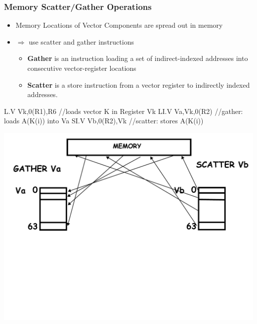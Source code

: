 \documentclass{beamer}
\newcommand{\emp}[1]{\textcolor{DikuRed}{ #1}}
\begin{document}
\begin{frame}[fragile,t]
\frametitle{Memory Scatter/Gather Operations}

\begin{itemize}
    \item Memory Locations of Vector Components are spread out in memory
    \item $\Rightarrow$ use scatter and gather instructions\medskip 
        \begin{itemize}
            \item \emp{\bf Gather} is an instruction loading a set of
                    indirect-indexed addresses into consecutive 
                    vector-register locations\smallskip
            \item \emp{\bf Scatter} is a store instruction from a vector
                    register to indirectly indexed addresses.
        \end  {itemize}
\end  {itemize}

\begin{colorcode}[fontsize=\scriptsize]
L.V   Vk,0(R1),R6  //loads vector K in Register Vk
LI.V  Va,Vk,0(R2)  //gather: loads A(K(i)) into Va
SI.V  Vb,0(R2),Vk  //scatter: stores A(K(i))
\end{colorcode}


\includegraphics[width=49ex]{Ch1Figs/VectScatterGather}

\end{frame}
\end{document}

